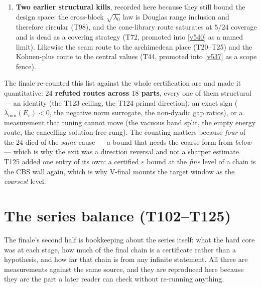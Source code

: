 \documentclass[11pt,a4paper]{article}
\begin{document}
\begin{enumerate}[leftmargin=1.6em,label=\textbf{K\arabic*.}]
($n_{\mathrm{soft}}=\dim$) closes $0/15$, with the strictly scalar \emph{induction} compounding to a
Schur factor of $2.7\times10^{-36}$ by $k=3$. The reason is a boundary layer: the new cells of a
grown window attach at the edge where the pole source sits, so a one-number summary of the bordering
is blind to the deciding direction. What survives is the graded ($n_{\mathrm{soft}}=1$) Loewner
minorant --- one soft direction is exactly the amount of geometry the step needs.
\item \textbf{Two earlier structural kills}, recorded here because they still bound the design space:
the cross-block $\sqrt{\lambda_0}$ law is Douglas range inclusion and therefore circular (T98), and the
cone-library route saturates at $5/24$ coverage and is dead as a covering strategy (T72, promoted into
\vref{v540} as a named limit). Likewise the seam route to the archimedean place (T20--T25) and the
Kohnen-plus route to the central values (T44, promoted into \vref{v537} as a scope fence).
\end{enumerate}

\noindent The finale re-counted this list against the whole certification arc and made it
quantitative: \textbf{$24$ refuted routes across $18$ parts}, every one of them structural --- an
identity (the T123 ceiling, the T124 primal direction), an exact sign ($\lambda_{\min}(E_c)<0$, the
negative norm surrogate, the non-dyadic gap ratios), or a measurement that tuning cannot move (the
vacuous band split, the empty energy route, the cancelling solution-free rung). The counting matters
because \emph{four} of the $24$ died of the \emph{same} cause --- a bound that needs the coarse form
from \emph{below} --- which is why the exit was a direction reversal and not a sharper estimate.
T125 added one entry of its own: a certified $\varepsilon$ bound at the \emph{fine} level of a chain
is the CBS wall again, which is why V-final mounts the target window as the \emph{coarsest} level.

\section{The series balance (T102--T125)}\label{sec:balance}
\noindent The finale's second half is bookkeeping about the series itself: what the hard core was at
each stage, how much of the final chain is a certificate rather than a hypothesis, and how far that
chain is from any infinite statement. All three are measurements against the same source, and they
are reproduced here because they are the part a later reader can check without re-running anything.
\end{document}
